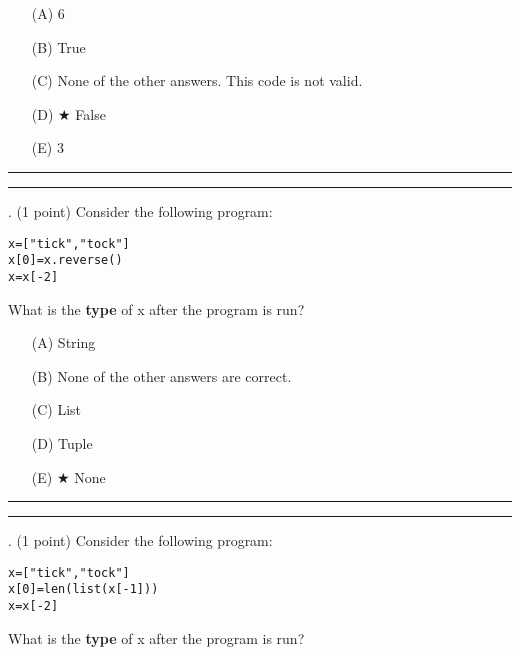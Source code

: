 \documentclass{article}
\begin{document}
\begin{enumerate}
\item[(A)]
6

\item[(B)]
True

\item[(C)]
None of the other answers. This code is not valid.

\item[(D)] $\bigstar$ 
False

\item[(E)]
3

\end{enumerate}

\vspace*{2em}
\hrule
\vspace{2em}

\vspace{2em}
\hrule height 2pt


\newpage
{}. (1 point)
Consider the following program:
\begin{verbatim}
x=["tick","tock"]
x[0]=x.reverse()
x=x[-2]
\end{verbatim}
What is the \textbf{type} of x after the program is run?


\begin{enumerate}
\item[(A)]
String

\item[(B)]
None of the other answers are correct.

\item[(C)]
List

\item[(D)]
Tuple

\item[(E)] $\bigstar$ 
None

\end{enumerate}

\vspace*{2em}
\hrule
\vspace{2em}

\vspace{2em}
\hrule height 2pt


\newpage
{}. (1 point)
Consider the following program:
\begin{verbatim}
x=["tick","tock"]
x[0]=len(list(x[-1]))
x=x[-2]
\end{verbatim}
What is the \textbf{type} of x after the program is run?
\end{document}
